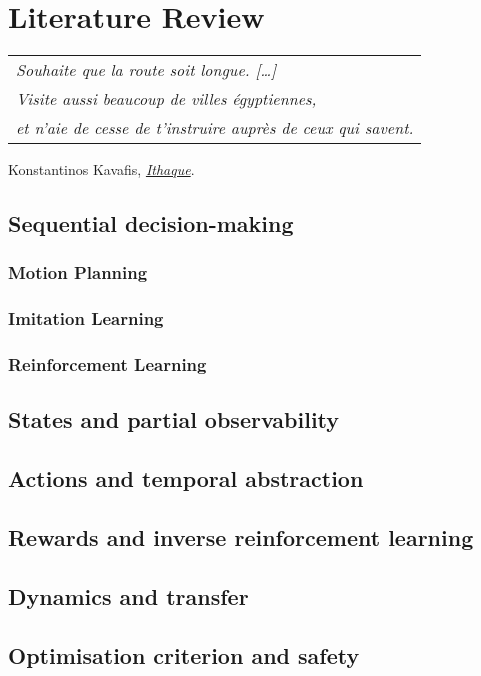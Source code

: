 
\chapter{Literature Review}
\label{chapter:2}

\begin{flushright}
	\begin{tabular}{@{}l@{}}
		\emph{Souhaite que la route soit longue. [\dots]}\\
		\emph{Visite aussi beaucoup de villes égyptiennes,}\\
		\emph{et n’aie de cesse de t’instruire auprès de ceux qui savent.}\\
	\end{tabular}
	
	Konstantinos Kavafis, \href{https://eleurent.github.io/sisyphe/texts/ithaki.html}{\emph{Ithaque}}.
\end{flushright}

\section{Sequential decision-making}
\subsection{Motion Planning}
\subsection{Imitation Learning}
\subsection{Reinforcement Learning}
\section{States and partial observability}
\section{Actions and temporal abstraction}
\section{Rewards and inverse reinforcement learning}
\section{Dynamics and transfer}
\section{Optimisation criterion and safety}
